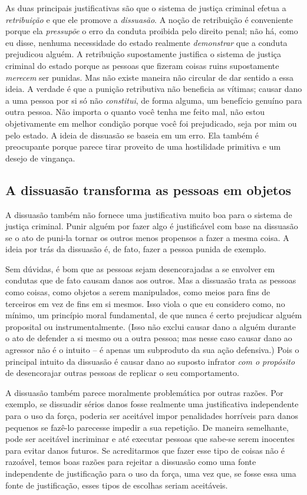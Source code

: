 As duas principais justificativas são que o sistema de justiça criminal efetua a \emph{retribuição} e que ele promove a \emph{dissuasão}. A noção de retribuição é conveniente porque ela \emph{pressupõe} o erro  da conduta proibida pelo direito penal; não há, como eu disse, nenhuma necessidade do estado realmente \emph{demonstrar} que a conduta prejudicou alguém. A retribuição supostamente justifica o sistema de justiça criminal do estado porque as pessoas que fizeram coisas ruins supostamente \emph{merecem} ser punidas. Mas não existe maneira não circular de dar sentido a essa ideia. A verdade é que a punição retributiva não beneficia as vítimas; causar dano a uma pessoa por si só não \emph{constitui}, de forma alguma, um benefício genuíno para outra pessoa. Não importa o quanto você tenha me feito mal, não estou objetivamente em melhor condição porque você foi prejudicado, seja por mim ou pelo estado. A ideia de dissuasão se baseia em um erro. Ela também é preocupante porque parece tirar proveito de uma hostilidade primitiva e um desejo de vingança.

\subsection*{A dissuasão transforma as pessoas em objetos}

A dissuasão também não fornece uma justificativa muito boa para o sistema de justiça criminal. Punir alguém por fazer algo é justificável com base na dissuasão se o ato de puni-la tornar os outros menos propensos a fazer a mesma coisa. A ideia por trás da dissuasão é, de fato, fazer a pessoa punida de exemplo.

Sem dúvidas, é bom que as pessoas sejam desencorajadas a se envolver em condutas que de fato causam danos aos outros. Mas a dissuasão trata as pessoas como coisas, como objetos a serem manipulados, como meios para fins de terceiros em vez de fins em si mesmos. Isso viola o que eu considero como, no mínimo, um princípio moral fundamental, de que nunca é certo prejudicar alguém proposital ou instrumentalmente. (Isso não exclui causar dano a alguém durante o ato de defender a si mesmo ou a outra pessoa; mas nesse caso causar dano ao agressor não é o intuito -- é apenas um subproduto da sua ação defensiva.) Pois o principal intuito da dissuasão é causar dano ao suposto infrator \emph{com o propósito} de desencorajar outras pessoas de replicar o seu comportamento.

A dissuasão também parece moralmente problemática por outras razões. Por exemplo, se dissuadir sérios danos fosse realmente uma justificativa independente para o uso da força, poderia ser aceitável impor penalidades horríveis para danos pequenos se fazê-lo parecesse impedir a sua repetição. De maneira semelhante, pode ser aceitável incriminar e até executar pessoas que sabe-se serem inocentes para evitar danos futuros. Se acreditarmos que fazer esse tipo de coisas não é razoável, temos boas razões para rejeitar a dissuasão como uma fonte independente de justificação para o uso da força, uma vez que, se fosse essa uma fonte de justificação, esses tipos de escolhas seriam aceitáveis.


